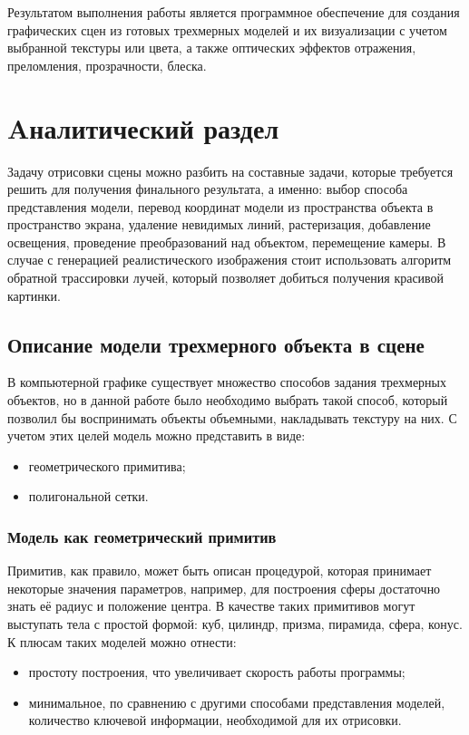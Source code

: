\documentclass[12pt,a4paper,oneside]{report}
\begin{document}
	Результатом выполнения работы является программное обеспечение для создания графических сцен из готовых трехмерных моделей и их визуализации с учетом выбранной текстуры или цвета, а также оптических эффектов отражения, преломления, прозрачности, блеска. 
	
 	\chapter {Aналитический раздел}
 	
 	 \quad Задачу отрисовки сцены можно разбить на составные задачи, которые требуется решить для получения финального результата, а именно: выбор способа представления модели, перевод координат модели из пространства объекта в пространство экрана, удаление невидимых линий, растеризация, добавление освещения, проведение преобразований над объектом, перемещение камеры. В случае с генерацией реалистического изображения стоит использовать алгоритм обратной трассировки лучей, который позволяет добиться получения красивой картинки.
 	  
 		 
 	\section{Описание модели трехмерного объекта в сцене}
 	
 	 \quad В компьютерной графике существует множество способов задания трехмерных объектов, но в данной работе было необходимо выбрать такой способ, который позволил бы воспринимать объекты объемными, накладывать текстуру на них. С учетом этих целей модель можно представить в виде:
 	\begin{itemize}
 		\item геометрического примитива;
 		\item полигональной сетки.
 	\end{itemize}

	\subsection{Модель как геометрический примитив}
	 \quad Примитив, как правило, может быть описан процедурой, которая принимает некоторые значения параметров, например, для построения сферы достаточно знать её радиус и положение центра. В качестве таких примитивов могут выступать тела с простой формой: куб, цилиндр, призма, пирамида, сфера, конус.\\
	
	К плюсам таких моделей можно отнести:
	\begin{itemize}
		\item простоту построения, что увеличивает скорость работы программы;
		\item минимальное, по сравнению с другими способами представления моделей, количество ключевой информации, необходимой для их отрисовки.
	\end{itemize}
	
\end{document}
